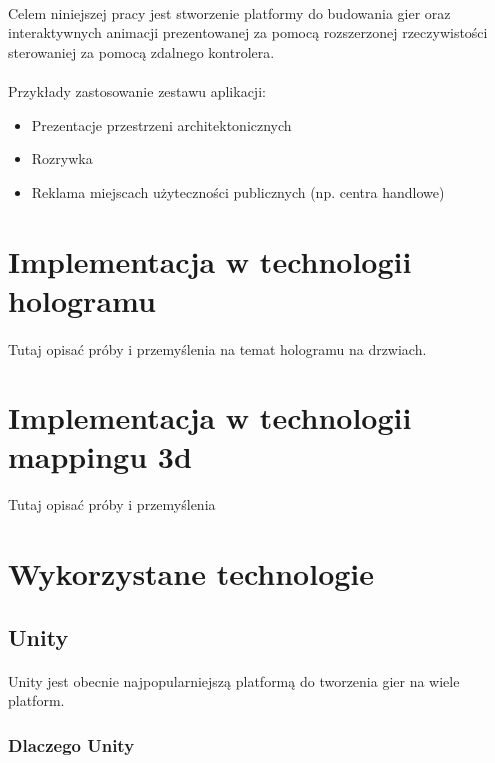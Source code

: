 \documentclass[12pt]{article}
\begin{document}
{{\paragraph{}
Celem niniejszej pracy jest stworzenie platformy do budowania gier oraz interaktywnych animacji prezentowanej za pomocą rozszerzonej rzeczywistości sterowaniej za pomocą zdalnego kontrolera.

\paragraph{}
Przykłady zastosowanie zestawu aplikacji:

\begin{itemize}
\item Prezentacje przestrzeni architektonicznych
\item Rozrywka
\item Reklama miejscach użyteczności publicznych (np. centra handlowe)
\end{itemize}

\section{Implementacja w technologii hologramu}
\paragraph{}
{\color{red}Tutaj opisać próby i przemyślenia na temat hologramu na drzwiach.}

\section{Implementacja w technologii mappingu 3d}
{\color{red}Tutaj opisać próby i przemyślenia}

\section{Wykorzystane technologie}

\subsection{Unity}
\paragraph{}
Unity jest obecnie najpopularniejszą platformą do tworzenia gier na wiele platform. 
\subsubsection{Dlaczego Unity}
}}
\end{document}
